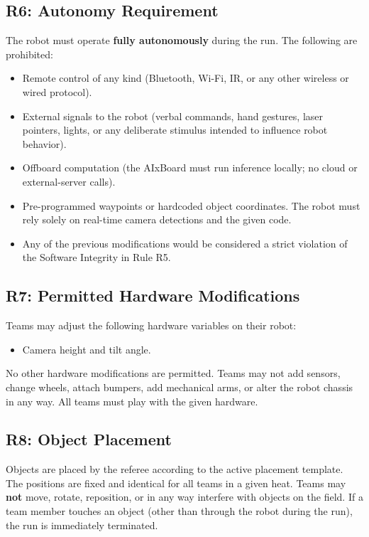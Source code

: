 \documentclass[a4]{article}
\begin{document}
\subsection*{R6: Autonomy Requirement}
The robot must operate \textbf{fully autonomously} during the run. The following are prohibited:
\begin{itemize}
    \item Remote control of any kind (Bluetooth, Wi-Fi, IR, or any other wireless or wired protocol).
    \item External signals to the robot (verbal commands, hand gestures, laser pointers, lights, or any deliberate stimulus intended to influence robot behavior).
    \item Offboard computation (the AIxBoard must run inference locally; no cloud or external-server calls).
    \item Pre-programmed waypoints or hardcoded object coordinates. The robot must rely solely on real-time camera detections and the given code.
    \item Any of the previous modifications would be considered a strict violation of the Software Integrity in Rule R5.
\end{itemize}

\subsection*{R7: Permitted Hardware Modifications}
Teams may adjust the following hardware variables on their robot:
\begin{itemize}
    \item Camera height and tilt angle.
\end{itemize}
No other hardware modifications are permitted. Teams may not add sensors, change wheels, attach bumpers, add mechanical arms, or alter the robot chassis in any way. All teams must play with the given hardware. 

\subsection*{R8: Object Placement}
Objects are placed by the referee according to the active placement template. The positions are fixed and identical for all teams in a given heat. Teams may \textbf{not} move, rotate, reposition, or in any way interfere with objects on the field. If a team member touches an object (other than through the robot during the run), the run is immediately terminated.
\end{document}
